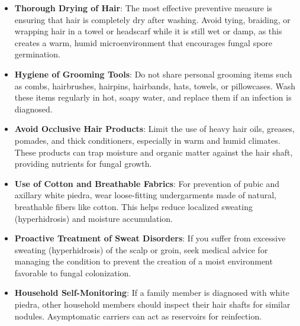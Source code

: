 \begin{itemize}
    \item \textbf{Thorough Drying of Hair}: The most effective preventive measure is ensuring that hair is completely dry after washing. Avoid tying, braiding, or wrapping hair in a towel or headscarf while it is still wet or damp, as this creates a warm, humid microenvironment that encourages fungal spore germination.
    \item \textbf{Hygiene of Grooming Tools}: Do not share personal grooming items such as combs, hairbrushes, hairpins, hairbands, hats, towels, or pillowcases. Wash these items regularly in hot, soapy water, and replace them if an infection is diagnosed.
    \item \textbf{Avoid Occlusive Hair Products}: Limit the use of heavy hair oils, greases, pomades, and thick conditioners, especially in warm and humid climates. These products can trap moisture and organic matter against the hair shaft, providing nutrients for fungal growth.
    \item \textbf{Use of Cotton and Breathable Fabrics}: For prevention of pubic and axillary white piedra, wear loose-fitting undergarments made of natural, breathable fibers like cotton. This helps reduce localized sweating (hyperhidrosis) and moisture accumulation.
    \item \textbf{Proactive Treatment of Sweat Disorders}: If you suffer from excessive sweating (hyperhidrosis) of the scalp or groin, seek medical advice for managing the condition to prevent the creation of a moist environment favorable to fungal colonization.
    \item \textbf{Household Self-Monitoring}: If a family member is diagnosed with white piedra, other household members should inspect their hair shafts for similar nodules. Asymptomatic carriers can act as reservoirs for reinfection.
\end{itemize}

